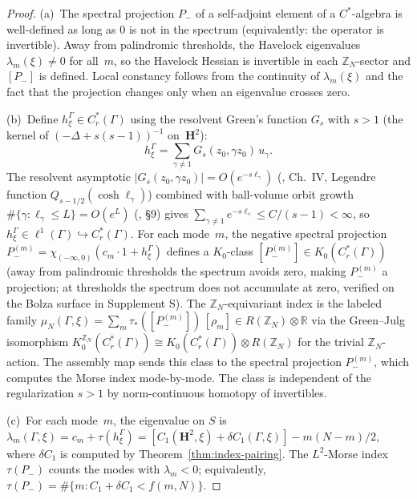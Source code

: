 \begin{proof}
(a)~The spectral projection $P_-$ of a self-adjoint element of a
$C^*$-algebra is well-defined as long as $0$ is not in the spectrum
(equivalently: the operator is invertible).  Away from palindromic
thresholds, the Havelock eigenvalues $\lambda_m(\xi) \ne 0$ for
all~$m$, so the Havelock Hessian is invertible in each
$\mathbb{Z}_N$-sector and $[P_-]$ is defined.
Local constancy follows from the continuity of
$\lambda_m(\xi)$ and the fact that the projection changes only
when an eigenvalue crosses zero.

(b)~Define $h_\xi^\Gamma \in C^*_r(\Gamma)$ using
the resolvent Green's function $G_s$ with $s > 1$
(the kernel of $(-\Delta + s(s{-}1))^{-1}$ on~$\mathbf{H}^2$):
\[
  h_\xi^\Gamma
  = \sum_{\gamma \ne 1}
    G_s(z_0, \gamma z_0)\, u_\gamma.
\]
The resolvent asymptotic
$|G_s(z_0, \gamma z_0)| = O(e^{-s\ell_\gamma})$
(\citealt{Helgason1984}, Ch.~IV, Legendre function
$Q_{s-1/2}(\cosh\ell_\gamma)$) combined with
ball-volume orbit growth
$\#\{\gamma : \ell_\gamma \le L\} = O(e^L)$
(\citealt{Buser1992}, \S 9) gives
$\sum_{\gamma \ne 1} e^{-s\ell_\gamma} \le C/(s{-}1) < \infty$,
so $h_\xi^\Gamma \in \ell^1(\Gamma) \hookrightarrow
C^*_r(\Gamma)$.
For each mode~$m$, the negative spectral projection
$P_-^{(m)} = \chi_{(-\infty,0)}(c_m\cdot 1 + h_\xi^\Gamma)$
defines a $K_0$-class
$[P_-^{(m)}] \in K_0(C^*_r(\Gamma))$
(away from palindromic thresholds the spectrum avoids
zero, making $P_-^{(m)}$ a projection; at thresholds
the spectrum does not accumulate at zero, verified on
the Bolza surface in Supplement S).
The $\mathbb{Z}_N$-equivariant index is the labeled family
$\mu_N(\Gamma,\xi) = \sum_m \tau_*([P_-^{(m)}])\,[\rho_m]
\in R(\mathbb{Z}_N) \otimes \mathbb{R}$
via the Green--Julg isomorphism
$K_0^{\mathbb{Z}_N}(C^*_r(\Gamma))
\cong K_0(C^*_r(\Gamma)) \otimes R(\mathbb{Z}_N)$
for the trivial $\mathbb{Z}_N$-action.
The assembly map sends this class to the spectral
projection $P_-^{(m)}$, which computes the Morse index
mode-by-mode.
The class is independent of the regularization $s > 1$
by norm-continuous homotopy of invertibles.

(c)~For each mode~$m$, the eigenvalue on $S$ is
$\lambda_m(\Gamma,\xi) = c_m + \tau(h_\xi^\Gamma)
= [C_1(\mathbf{H}^2,\xi) + \delta C_1(\Gamma,\xi)] - m(N{-}m)/2$,
where $\delta C_1$ is computed by
Theorem~\ref{thm:index-pairing}.
The $L^2$-Morse index $\tau(P_-)$ counts the modes with
$\lambda_m < 0$; equivalently,
$\tau(P_-) = \#\{m : C_1 + \delta C_1 < f(m,N)\}$.
\end{proof}

